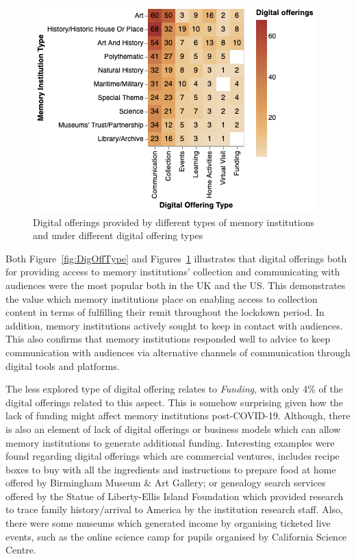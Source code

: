 \documentclass{egpubl}
\begin{document}
\begin{figure}[h]
  \centering
  \includegraphics[width=\linewidth]{images/museumoffering.png}
  \caption{\label{fig:MTypeOfferings}
           Digital offerings provided by different types of memory institutions and under different digital offering types}
\end{figure}

Both Figure~\ref{fig:DigOffType} and Figures~\ref{fig:MTypeOfferings} illustrates that digital offerings both for providing access to memory institutions' collection and communicating with audiences were the most popular both in the UK and the US. This demonstrates the value which memory institutions place on enabling access to collection content in terms of fulfilling their remit throughout the lockdown period. In addition, memory institutions actively sought to keep in contact with audiences. This also confirms that memory institutions responded well to advice to keep communication with audiences via alternative channels of communication through digital tools and platforms. 




The less explored type of digital offering relates to \emph{Funding}, with only 4\% of the digital offerings related to this aspect. This is somehow surprising given how the lack of funding might affect memory institutions post-COVID-19. Although, there is also an element of lack of digital offerings or business models which can allow memory institutions to generate additional funding. Interesting examples were found regarding digital offerings which are commercial ventures, includes recipe boxes to buy with all the ingredients and instructions to prepare food at home offered by Birmingham Museum \& Art Gallery; or genealogy search services offered by the Statue of Liberty-Ellis Island Foundation which provided research to trace family history/arrival to America by the institution research staff. Also, there were some museums which generated income by organising ticketed live events, such as the online science camp for pupils organised by California Science Centre.
\end{document}
